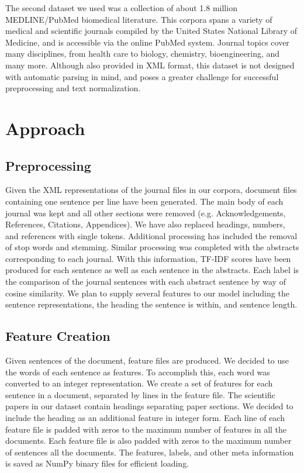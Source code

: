 \documentclass[11pt]{article}
\begin{document}
	The second dataset we used was a collection of about 1.8 million MEDLINE/PubMed biomedical literature. This corpora spans a variety of medical and scientific journals compiled by the United States National Library of Medicine, and is accessible via the online PubMed system. Journal topics cover many disciplines, from health care to biology, chemistry, bioengineering, and many more. Although also provided in XML format, this dataset is not designed with automatic parsing in mind, and poses a greater challenge for successful preprocessing and text normalization.

\section{Approach}
	\subsection{Preprocessing} %
		Given the XML representations of the journal files in our corpora, document files containing one sentence per line have been generated. The main body of each journal was kept and all other sections were removed (e.g. Acknowledgements, References, Citations, Appendices). We have also replaced headings, numbers, and references with single tokens. Additional processing has included the removal of stop words and stemming. Similar processing was completed with the abstracts corresponding to each journal. With this information, TF-IDF scores have been produced for each sentence as well as each sentence in the abstracts. Each label is the comparison of the journal sentences with each abstract sentence by way of cosine similarity. We plan to supply several features to our model including the sentence representations, the heading the sentence is within, and sentence length.
	
	\subsection{Feature Creation}	
	Given sentences of the document, feature files are produced. We decided to use the words of each sentence as features. To accomplish this, each word was converted to an integer representation. We create a set of features for each sentence in a document, separated by lines in the feature file. The scientific papers in our dataset contain headings separating paper sections. We decided to include the heading as an additional feature in integer form. Each line of each feature file is padded with zeros to the maximum number of features in all the documents. Each feature file is also padded with zeros to the maximum number of sentences all the documents. The features, labels, and other meta information is saved as NumPy binary files for efficient loading.
	
\end{document}
